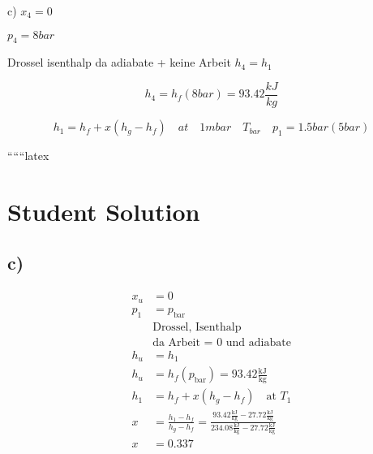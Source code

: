 c) $x_4 = 0$

$p_4 = 8 bar$

Drossel isenthalp da adiabate + keine Arbeit $h_4 = h_1$

\[
h_4 = h_f (8 bar) = 93.42 \frac{kJ}{kg}
\]

\[
h_1 = h_f + x (h_g - h_f) \quad at \quad 1 mbar \quad T_{bar} \quad p_{1} = 1.5 bar (5 bar)
\]

``````latex


\section*{Student Solution}



\subsection*{c)}
\begin{align*}
    x_u &= 0 \\
    p_1 &= p_{\text{bar}} \\
    &\text{Drossel, Isenthalp} \\
    &\text{da Arbeit = 0 und adiabate} \\
    h_u &= h_1 \\
    h_u &= h_f(p_{\text{bar}}) = 93.42 \frac{\text{kJ}}{\text{kg}} \\
    h_1 &= h_f + x(h_g - h_f) \quad \text{at } T_1 \\
    x &= \frac{h_1 - h_f}{h_g - h_f} = \frac{93.42 \frac{\text{kJ}}{\text{kg}} - 27.72 \frac{\text{kJ}}{\text{kg}}}{234.08 \frac{\text{kJ}}{\text{kg}} - 27.72 \frac{\text{kJ}}{\text{kg}}} \\
    x &= 0.337
\end{align*}